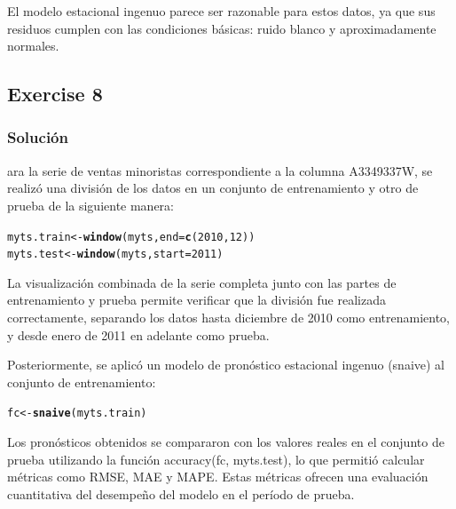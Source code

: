 \documentclass[12pt]{article}\usepackage[]{graphicx}\usepackage[]{xcolor}
\makeatletter
\newcommand{\hlnum}[1]{\textcolor[rgb]{0.686,0.059,0.569}{#1}}%
\newcommand{\hldef}[1]{\textcolor[rgb]{0.345,0.345,0.345}{#1}}%
\newcommand{\hlkwb}[1]{\textcolor[rgb]{0.69,0.353,0.396}{#1}}%
\newcommand{\hlkwc}[1]{\textcolor[rgb]{0.333,0.667,0.333}{#1}}%
\newcommand{\hlkwd}[1]{\textcolor[rgb]{0.737,0.353,0.396}{\textbf{#1}}}%
\newenvironment{kframe}{%
 \def\at@end@of@kframe{}%
 \ifinner\ifhmode%
  \def\at@end@of@kframe{\end{minipage}}%
  \begin{minipage}{\columnwidth}%
 \fi\fi%
 \def\FrameCommand##1{\hskip\@totalleftmargin \hskip-\fboxsep
 \colorbox{shadecolor}{##1}\hskip-\fboxsep
     \hskip-\linewidth \hskip-\@totalleftmargin \hskip\columnwidth}%
 \MakeFramed {\advance\hsize-\width
   \@totalleftmargin\z@ \linewidth\hsize
   \@setminipage}}%
 {\par\unskip\endMakeFramed%
 \at@end@of@kframe}
\newenvironment{knitrout}{}{} %
\makeatother
\begin{document}
El modelo estacional ingenuo parece ser razonable para estos datos, ya que sus residuos cumplen con las condiciones básicas: ruido blanco y aproximadamente normales.


\subsection{Exercise 8}

\subsubsection{Solución}

ara la serie de ventas minoristas correspondiente a la columna A3349337W, se realizó una división de los datos en un conjunto de entrenamiento y otro de prueba de la siguiente manera:

\begin{knitrout}
\color{fgcolor}\begin{kframe}
\begin{alltt}
\hldef{myts.train} \hlkwb{<-} \hlkwd{window}\hldef{(myts,} \hlkwc{end}\hldef{=}\hlkwd{c}\hldef{(}\hlnum{2010}\hldef{,}\hlnum{12}\hldef{))}
\hldef{myts.test} \hlkwb{<-} \hlkwd{window}\hldef{(myts,} \hlkwc{start}\hldef{=}\hlnum{2011}\hldef{)}
\end{alltt}
\end{kframe}
\end{knitrout}

La visualización combinada de la serie completa junto con las partes de entrenamiento y prueba permite verificar que la división fue realizada correctamente, separando los datos hasta diciembre de 2010 como entrenamiento, y desde enero de 2011 en adelante como prueba.

Posteriormente, se aplicó un modelo de pronóstico estacional ingenuo (snaive) al conjunto de entrenamiento:

\begin{knitrout}
\color{fgcolor}\begin{kframe}
\begin{alltt}
\hldef{fc} \hlkwb{<-} \hlkwd{snaive}\hldef{(myts.train)}
\end{alltt}
\end{kframe}
\end{knitrout}

Los pronósticos obtenidos se compararon con los valores reales en el conjunto de prueba utilizando la función accuracy(fc, myts.test), lo que permitió calcular métricas como RMSE, MAE y MAPE. Estas métricas ofrecen una evaluación cuantitativa del desempeño del modelo en el período de prueba.
\end{document}
